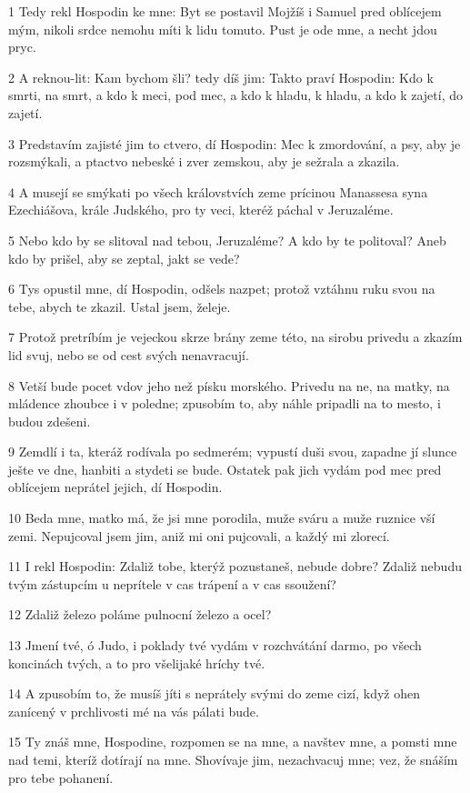 \par 1 Tedy rekl Hospodin ke mne: Byt se postavil Mojžíš i Samuel pred oblícejem mým, nikoli srdce nemohu míti k lidu tomuto. Pust je ode mne, a necht jdou pryc.
\par 2 A reknou-lit: Kam bychom šli? tedy díš jim: Takto praví Hospodin: Kdo k smrti, na smrt, a kdo k meci, pod mec, a kdo k hladu, k hladu, a kdo k zajetí, do zajetí.
\par 3 Predstavím zajisté jim to ctvero, dí Hospodin: Mec k zmordování, a psy, aby je rozsmýkali, a ptactvo nebeské i zver zemskou, aby je sežrala a zkazila.
\par 4 A musejí se smýkati po všech královstvích zeme prícinou Manassesa syna Ezechiášova, krále Judského, pro ty veci, kteréž páchal v Jeruzaléme.
\par 5 Nebo kdo by se slitoval nad tebou, Jeruzaléme? A kdo by te politoval? Aneb kdo by prišel, aby se zeptal, jakt se vede?
\par 6 Tys opustil mne, dí Hospodin, odšels nazpet; protož vztáhnu ruku svou na tebe, abych te zkazil. Ustal jsem, želeje.
\par 7 Protož pretríbím je vejeckou skrze brány zeme této, na sirobu privedu a zkazím lid svuj, nebo se od cest svých nenavracují.
\par 8 Vetší bude pocet vdov jeho než písku morského. Privedu na ne, na matky, na mládence zhoubce i v poledne; zpusobím to, aby náhle pripadli na to mesto, i budou zdešeni.
\par 9 Zemdlí i ta, kteráž rodívala po sedmerém; vypustí duši svou, zapadne jí slunce ješte ve dne, hanbiti a stydeti se bude. Ostatek pak jich vydám pod mec pred oblícejem neprátel jejich, dí Hospodin.
\par 10 Beda mne, matko má, že jsi mne porodila, muže sváru a muže ruznice vší zemi. Nepujcoval jsem jim, aniž mi oni pujcovali, a každý mi zlorecí.
\par 11 I rekl Hospodin: Zdaliž tobe, kterýž pozustaneš, nebude dobre? Zdaliž nebudu tvým zástupcím u neprítele v cas trápení a v cas ssoužení?
\par 12 Zdaliž železo poláme pulnocní železo a ocel?
\par 13 Jmení tvé, ó Judo, i poklady tvé vydám v rozchvátání darmo, po všech koncinách tvých, a to pro všelijaké hríchy tvé.
\par 14 A zpusobím to, že musíš jíti s neprátely svými do zeme cizí, když ohen zanícený v prchlivosti mé na vás pálati bude.
\par 15 Ty znáš mne, Hospodine, rozpomen se na mne, a navštev mne, a pomsti mne nad temi, kteríž dotírají na mne. Shovívaje jim, nezachvacuj mne; vez, že snáším pro tebe pohanení.
